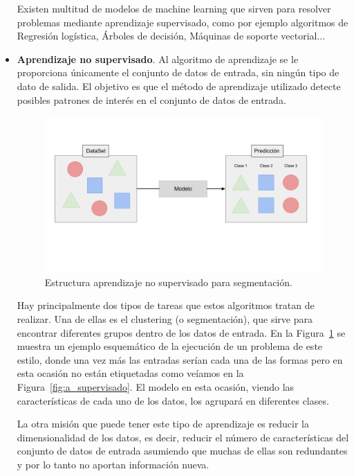 \documentclass[a4paper, 12pt]{book}
\begin{document}
\begin{itemize}
    Existen multitud de modelos de machine learning que sirven para resolver problemas mediante aprendizaje supervisado, como por ejemplo algoritmos de Regresión logística, Árboles de decisión, Máquinas de soporte vectorial...
    
    \item \textbf{Aprendizaje no supervisado}. Al algoritmo de aprendizaje se le proporciona únicamente el conjunto de datos de entrada, sin ningún tipo de dato de salida. El objetivo es que el método de aprendizaje utilizado detecte posibles patrones de interés en el conjunto de datos de entrada. 
    
    \begin{figure}[]
      \centering
      \includegraphics[width=12cm, keepaspectratio]{img/a_no_supervisado.png}
      \caption{Estructura aprendizaje no supervisado para segmentación.}\label{fig:a_no_supervisado}
    \end{figure}
    
    Hay principalmente dos tipos de tareas que estos algoritmos tratan de realizar. Una de ellas es el clustering (o segmentación), que sirve para encontrar diferentes grupos dentro de los datos de entrada. En la Figura~\ref{fig:a_no_supervisado} se muestra un ejemplo esquemático de la ejecución de un problema de este estilo, donde una vez más las entradas serían cada una de las formas pero en esta ocasión no están etiquetadas como veíamos en la Figura~\ref{fig:a_supervisado}. El modelo en esta ocasión, viendo las características de cada uno de los datos, los agrupará en diferentes clases.
    
    La otra misión que puede tener este tipo de aprendizaje es reducir la dimensionalidad de los datos, es decir, reducir el número de características del conjunto de datos de entrada asumiendo que muchas de ellas son redundantes y por lo tanto no aportan información nueva.
    

\end{itemize}
\end{document}
